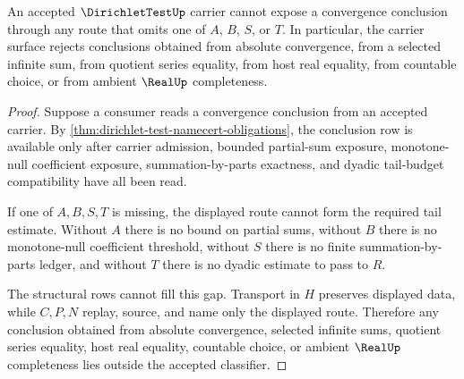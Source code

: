 \begin{theorem}
\label{thm:dirichlet-test-nonescape-boundary}
An accepted $\DirichletTestUp$ carrier cannot expose a convergence conclusion through any route that omits one of $A$, $B$, $S$, or $T$. In particular, the carrier surface rejects conclusions obtained from absolute convergence, from a selected infinite sum, from quotient series equality, from host real equality, from countable choice, or from ambient $\RealUp$ completeness.
\end{theorem}
\begin{proof}
Suppose a consumer reads a convergence conclusion from an accepted carrier. By \autoref{thm:dirichlet-test-namecert-obligations}, the conclusion row is available only after carrier admission, bounded partial-sum exposure, monotone-null coefficient exposure, summation-by-parts exactness, and dyadic tail-budget compatibility have all been read.

If one of $A,B,S,T$ is missing, the displayed route cannot form the required tail estimate. Without $A$ there is no bound on partial sums, without $B$ there is no monotone-null coefficient threshold, without $S$ there is no finite summation-by-parts ledger, and without $T$ there is no dyadic estimate to pass to $R$.

The structural rows cannot fill this gap. Transport in $H$ preserves displayed data, while $C,P,N$ replay, source, and name only the displayed route. Therefore any conclusion obtained from absolute convergence, selected infinite sums, quotient series equality, host real equality, countable choice, or ambient $\RealUp$ completeness lies outside the accepted classifier.
\end{proof}


\begin{closurestatus}{\DirichletTestUp}
  \theoryclosure{\seedClosure}
  \formalstatus{\unformalizedV}
\end{closurestatus}

